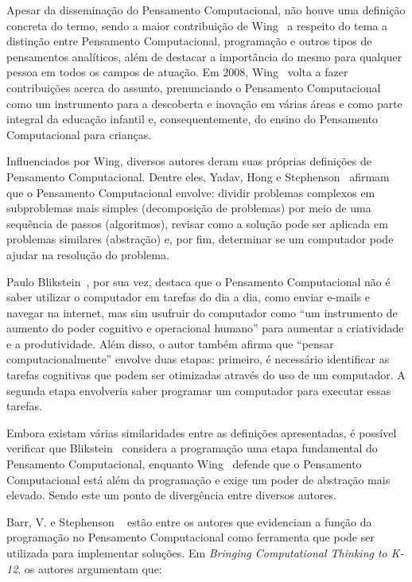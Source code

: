 Apesar da disseminação do Pensamento Computacional, não houve uma definição concreta do termo, sendo a maior contribuição de Wing~\cite{wing_computational_2006} a respeito do tema a distinção entre Pensamento Computacional, programação e outros tipos de pensamentos analíticos, além de destacar a importância do mesmo para qualquer pessoa em todos os campos de atuação. Em 2008, Wing~\cite{wing_computational_2008} volta a fazer contribuições acerca do assunto, prenunciando o Pensamento Computacional como um instrumento para a descoberta e inovação em várias áreas e como parte integral da educação infantil e, consequentemente, do ensino do Pensamento Computacional para crianças.

Influenciados por Wing, diversos autores deram suas próprias definições de Pensamento Computacional. Dentre eles, Yadav, Hong e Stephenson~\cite{yadav_computational_2016} afirmam que o Pensamento Computacional envolve: dividir problemas complexos em subproblemas mais simples (decomposição de problemas) por meio de uma sequência de passos (algoritmos), revisar como a solução pode ser aplicada em problemas similares (abstração) e, por fim, determinar se um computador pode ajudar na resolução do problema.

Paulo Blikstein~\cite{blikstein_o_2008}, por sua vez, destaca que o Pensamento Computacional não é saber utilizar o computador em tarefas do dia a dia, como enviar e-mails e navegar na  internet,  mas sim usufruir do computador como “um instrumento de aumento do poder cognitivo e operacional humano” para aumentar a criatividade e a produtividade. Além disso, o autor também afirma que “pensar computacionalmente” envolve duas etapas: primeiro, é necessário identificar as tarefas cognitivas que podem ser otimizadas através do uso de um computador. A segunda etapa envolveria saber programar um computador para executar essas tarefas.

Embora existam várias similaridades entre as definições apresentadas, é possível verificar que Blikstein~\cite{blikstein_o_2008} considera a programação uma etapa fundamental do Pensamento Computacional, enquanto Wing~\cite{wing_computational_2006} defende que o Pensamento Computacional está além da programação e exige um poder de abstração mais elevado. Sendo este um ponto de divergência entre diversos autores.

Barr, V. e Stephenson ~\cite{barr_bringing_2011} estão entre os autores que evidenciam a função da programação no Pensamento Computacional como ferramenta que pode ser utilizada para implementar soluções. Em \textit{Bringing Computational Thinking to K-12}, os autores argumentam que:

